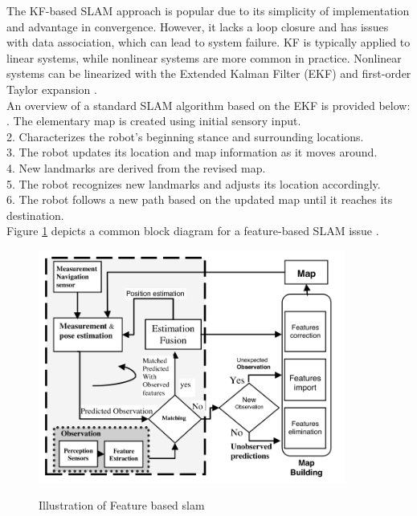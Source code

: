 The KF-based SLAM approach is popular due to its simplicity of implementation and advantage in convergence. However, it lacks a loop closure and has issues with data association, which can lead to system failure. KF is typically applied to linear systems, while nonlinear systems are more common in practice. Nonlinear systems can be linearized with the Extended Kalman Filter (EKF) and first-order Taylor expansion \cite{julier2001counter}.\\
An overview of a standard SLAM algorithm based on the EKF is provided below: \cite{Taheri2021}\\
. The elementary map is created using initial sensory input.\\
2. Characterizes the robot's beginning stance and surrounding locations.\\
3. The robot updates its location and map information as it moves around.\\
4. New landmarks are derived from the revised map.\\
5. The robot recognizes new landmarks and adjusts its location accordingly.\\
6. The robot follows a new path based on the updated map until it reaches its destination.\\
 Figure \ref{fig:Feature based slam} depicts a common block diagram for a feature-based SLAM issue \cite{leonard2012directed}. 
\begin{figure}[H]
  \centering
  \includegraphics[width=0.9\textwidth]{Figures/Feature based slam.PNG}
  \caption[Illustration of Feature based slam]{Illustration of Feature based slam} \cite{leonard2012directed}
  \label{fig:Feature based slam}
\end{figure}

